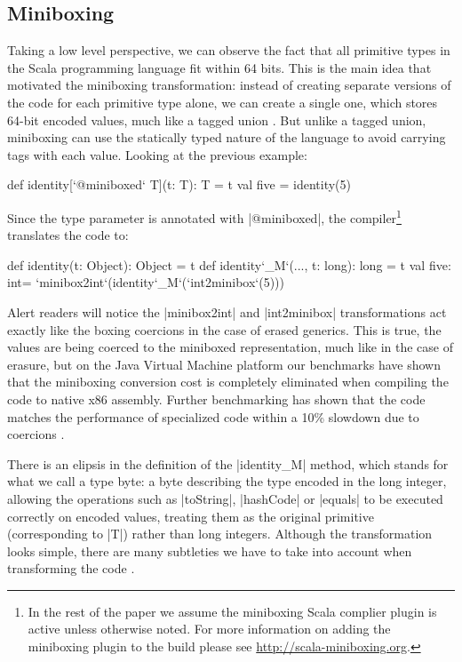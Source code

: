 \subsection{Miniboxing}

Taking a low level perspective, we can observe the fact that all primitive types in the Scala programming language fit within 64 bits. This is the main idea that motivated the miniboxing transformation: instead of creating separate versions of the code for each primitive type alone, we can create a single one, which stores 64-bit encoded values, much like a tagged union \cite{tagged-unions-lua}. But unlike a tagged union, miniboxing can use the statically typed nature of the language to avoid carrying tags with each value. Looking at the previous example:

\begin{lstlisting-nobreak}
 def identity[`@miniboxed` T](t: T): T = t
 val five = identity(5)
\end{lstlisting-nobreak}

Since the type parameter is annotated with |@miniboxed|, the compiler\footnote{In the rest of the paper we assume the miniboxing Scala complier plugin is active unless otherwise noted. For more information on adding the miniboxing plugin to the build please see \url{http://scala-miniboxing.org}.} translates the code to:

\begin{lstlisting-nobreak}
 def identity(t: Object): Object = t
 def identity`_M`(..., t: long): long = t
 val five: int= `minibox2int`(identity`_M`(`int2minibox`(5)))
\end{lstlisting-nobreak}

Alert readers will notice the |minibox2int| and |int2minibox| transformations act exactly like the boxing coercions in the case of  erased generics. This is true, the values are being coerced to the miniboxed representation, much like in the case of erasure, but on the Java Virtual Machine platform our benchmarks have shown that the miniboxing conversion cost is completely eliminated when compiling the code to native x86 assembly. Further benchmarking has shown that the code matches the performance of specialized code within a 10\% slowdown due to coercions \cite{miniboxing}.

There is an elipsis in the definition of the |identity_M| method, which stands for what we call a type byte: a byte describing the type encoded in the long integer, allowing the operations such as |toString|, |hashCode| or |equals| to be executed correctly on encoded values, treating them as the original primitive (corresponding to |T|) rather than long integers. Although the transformation looks simple, there are many subtleties we have to take into account when transforming the code \cite{miniboxing,miniboxing-linkedlist,ldl}.

